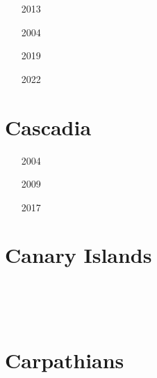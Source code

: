 \begin{small}
\begin{itemize}
\item[2013]
\item[2004] 
\item[2019]
\item[2022]
\end{itemize}
\end{small}



\section{Cascadia}

\begin{small}
\begin{itemize}
\item[2004]
\item[2009]
\item[2017] 
\end{itemize}
\end{small}

\section{Canary Islands}

\begin{small}
\begin{itemize}
\item[\twothousandfifteen]
\\
\item[\twothousandtwentytwo]
 \\
\item[\twothousandtwentythree]
\end{itemize}
\end{small}


\section{Carpathians}

\begin{small}
\begin{itemize}
\item[\twothousand]
\item[\twothousandfour]
\item[\twothousandfive]
\item[\twothousandsix]
\item[\twothousandnineteen]
\end{itemize}
\end{small}

